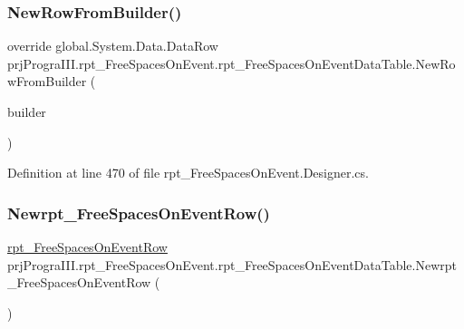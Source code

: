 \subsubsection{\texorpdfstring{New\+Row\+From\+Builder()}{NewRowFromBuilder()}}
{\footnotesize\ttfamily override global.\+System.\+Data.\+Data\+Row prj\+Progra\+I\+I\+I.\+rpt\+\_\+\+Free\+Spaces\+On\+Event.\+rpt\+\_\+\+Free\+Spaces\+On\+Event\+Data\+Table.\+New\+Row\+From\+Builder (\begin{DoxyParamCaption}\item[{global\+::\+System.\+Data.\+Data\+Row\+Builder}]{builder }\end{DoxyParamCaption})\hspace{0.3cm}{\ttfamily [protected]}}



Definition at line 470 of file rpt\+\_\+\+Free\+Spaces\+On\+Event.\+Designer.\+cs.

\hypertarget{classprj_progra_i_i_i_1_1rpt___free_spaces_on_event_1_1rpt___free_spaces_on_event_data_table_adca49c665671f2fcebd8cf12bcce9624}{}\label{classprj_progra_i_i_i_1_1rpt___free_spaces_on_event_1_1rpt___free_spaces_on_event_data_table_adca49c665671f2fcebd8cf12bcce9624} 
\subsubsection{\texorpdfstring{Newrpt\+\_\+\+Free\+Spaces\+On\+Event\+Row()}{Newrpt\_FreeSpacesOnEventRow()}}
{\footnotesize\ttfamily \hyperlink{classprj_progra_i_i_i_1_1rpt___free_spaces_on_event_1_1rpt___free_spaces_on_event_row}{rpt\+\_\+\+Free\+Spaces\+On\+Event\+Row} prj\+Progra\+I\+I\+I.\+rpt\+\_\+\+Free\+Spaces\+On\+Event.\+rpt\+\_\+\+Free\+Spaces\+On\+Event\+Data\+Table.\+Newrpt\+\_\+\+Free\+Spaces\+On\+Event\+Row (\begin{DoxyParamCaption}{ }\end{DoxyParamCaption})}



